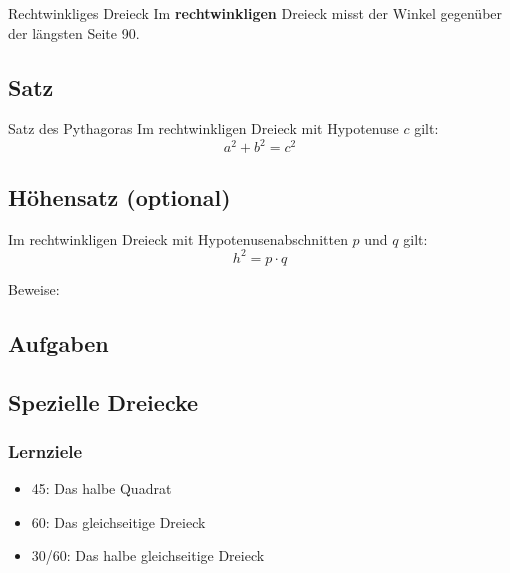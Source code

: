 \begin{definition}{Rechtwinkliges Dreieck}{}
Im \textbf{rechtwinkligen} Dreieck misst der Winkel gegenüber der
längsten Seite 90\degre.
\end{definition}



\subsection{Satz}
\label{satzDesPythagoras}
\begin{gesetz}{Satz des Pythagoras}{}
Im rechtwinkligen Dreieck mit Hypotenuse $c$ gilt:
$$a^2 + b^2 = c^2$$
\end{gesetz}




\subsection{Höhensatz (optional)}

Im rechtwinkligen Dreieck mit Hypotenusenabschnitten $p$ und $q$ gilt:
$$h^2=p\cdot{}q$$

Beweise:


\subsection*{Aufgaben}

\newpage

\subsection{Spezielle Dreiecke}\label{spezielleDreiecke}

\subsubsection*{Lernziele}
\begin{itemize}
\item 45\degre: Das halbe Quadrat
\item 60\degre: Das gleichseitige Dreieck
  \item 30\degre/60\degre: Das halbe gleichseitige Dreieck
\end{itemize}

